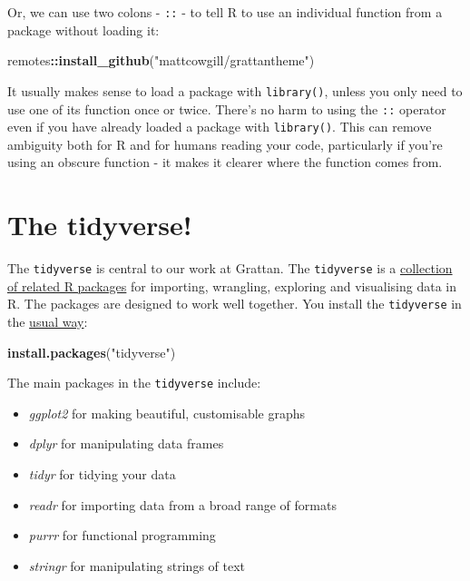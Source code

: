 \documentclass[]{book}
\newenvironment{Shaded}{\begin{snugshade}}{\end{snugshade}}
\newcommand{\KeywordTok}[1]{\textcolor[rgb]{0.13,0.29,0.53}{\textbf{#1}}}
\newcommand{\NormalTok}[1]{#1}
\newcommand{\OperatorTok}[1]{\textcolor[rgb]{0.81,0.36,0.00}{\textbf{#1}}}
\newcommand{\StringTok}[1]{\textcolor[rgb]{0.31,0.60,0.02}{#1}}
\providecommand{\tightlist}{%
  \setlength{\itemsep}{0pt}\setlength{\parskip}{0pt}}
\begin{document}
Or, we can use two colons - \texttt{::} - to tell R to use an individual function from a package without loading it:

\begin{Shaded}
\begin{Highlighting}[]
\NormalTok{remotes}\OperatorTok{::}\KeywordTok{install_github}\NormalTok{(}\StringTok{"mattcowgill/grattantheme"}\NormalTok{)}
\end{Highlighting}
\end{Shaded}

It usually makes sense to load a package with \texttt{library()}, unless you only need to use one of its function once or twice. There's no harm to using the \texttt{::} operator even if you have already loaded a package with \texttt{library()}. This can remove ambiguity both for R and for humans reading your code, particularly if you're using an obscure function - it makes it clearer where the function comes from.

\hypertarget{tidyverse}{%
\section{The tidyverse!}\label{tidyverse}}

The \texttt{tidyverse} is central to our work at Grattan. The \texttt{tidyverse} is a \href{https://www.tidyverse.org/packages/}{collection of related R packages} for importing, wrangling, exploring and visualising data in R. The packages are designed to work well together. You install the \texttt{tidyverse} in the \protect\hyperlink{install-packages}{usual way}:

\begin{Shaded}
\begin{Highlighting}[]
\KeywordTok{install.packages}\NormalTok{(}\StringTok{"tidyverse"}\NormalTok{)}
\end{Highlighting}
\end{Shaded}

The main packages in the \texttt{tidyverse} include:

\begin{itemize}
\tightlist
\item
  \emph{ggplot2} for making beautiful, customisable graphs
\item
  \emph{dplyr} for manipulating data frames
\item
  \emph{tidyr} for tidying your data
\item
  \emph{readr} for importing data from a broad range of formats
\item
  \emph{purrr} for functional programming
\item
  \emph{stringr} for manipulating strings of text
\end{itemize}
\end{document}
